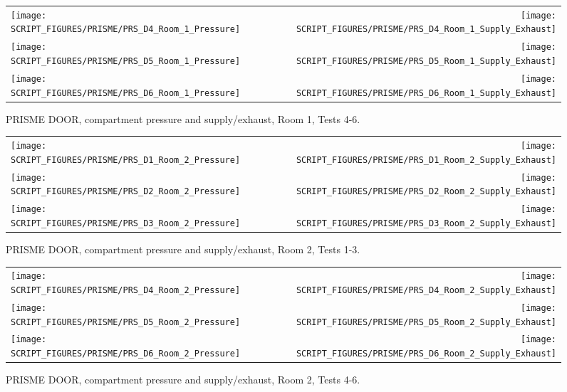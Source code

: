 \begin{figure}[p]
\begin{tabular*}{\textwidth}{l@{\extracolsep{\fill}}r}
\texttt{[image: SCRIPT\_FIGURES/PRISME/PRS\_D4\_Room\_1\_Pressure]} &
\texttt{[image: SCRIPT\_FIGURES/PRISME/PRS\_D4\_Room\_1\_Supply\_Exhaust]} \\
\texttt{[image: SCRIPT\_FIGURES/PRISME/PRS\_D5\_Room\_1\_Pressure]} &
\texttt{[image: SCRIPT\_FIGURES/PRISME/PRS\_D5\_Room\_1\_Supply\_Exhaust]} \\
\texttt{[image: SCRIPT\_FIGURES/PRISME/PRS\_D6\_Room\_1\_Pressure]} &
\texttt{[image: SCRIPT\_FIGURES/PRISME/PRS\_D6\_Room\_1\_Supply\_Exhaust]}
\end{tabular*}
\caption{PRISME DOOR, compartment pressure and supply/exhaust, Room 1, Tests 4-6.}
\label{PRISME_Room_1_Pressure_4-6}
\end{figure}

\begin{figure}[p]
\begin{tabular*}{\textwidth}{l@{\extracolsep{\fill}}r}
\texttt{[image: SCRIPT\_FIGURES/PRISME/PRS\_D1\_Room\_2\_Pressure]} &
\texttt{[image: SCRIPT\_FIGURES/PRISME/PRS\_D1\_Room\_2\_Supply\_Exhaust]} \\
\texttt{[image: SCRIPT\_FIGURES/PRISME/PRS\_D2\_Room\_2\_Pressure]} &
\texttt{[image: SCRIPT\_FIGURES/PRISME/PRS\_D2\_Room\_2\_Supply\_Exhaust]} \\
\texttt{[image: SCRIPT\_FIGURES/PRISME/PRS\_D3\_Room\_2\_Pressure]} &
\texttt{[image: SCRIPT\_FIGURES/PRISME/PRS\_D3\_Room\_2\_Supply\_Exhaust]}
\end{tabular*}
\caption{PRISME DOOR, compartment pressure and supply/exhaust, Room 2, Tests 1-3.}
\label{PRISME_Room_2_Pressure_1-3}
\end{figure}

\begin{figure}[p]
\begin{tabular*}{\textwidth}{l@{\extracolsep{\fill}}r}
\texttt{[image: SCRIPT\_FIGURES/PRISME/PRS\_D4\_Room\_2\_Pressure]} &
\texttt{[image: SCRIPT\_FIGURES/PRISME/PRS\_D4\_Room\_2\_Supply\_Exhaust]} \\
\texttt{[image: SCRIPT\_FIGURES/PRISME/PRS\_D5\_Room\_2\_Pressure]} &
\texttt{[image: SCRIPT\_FIGURES/PRISME/PRS\_D5\_Room\_2\_Supply\_Exhaust]} \\
\texttt{[image: SCRIPT\_FIGURES/PRISME/PRS\_D6\_Room\_2\_Pressure]} &
\texttt{[image: SCRIPT\_FIGURES/PRISME/PRS\_D6\_Room\_2\_Supply\_Exhaust]}
\end{tabular*}
\caption{PRISME DOOR, compartment pressure and supply/exhaust, Room 2, Tests 4-6.}
\label{PRISME_Room_2_Pressure_4-6}
\end{figure}


